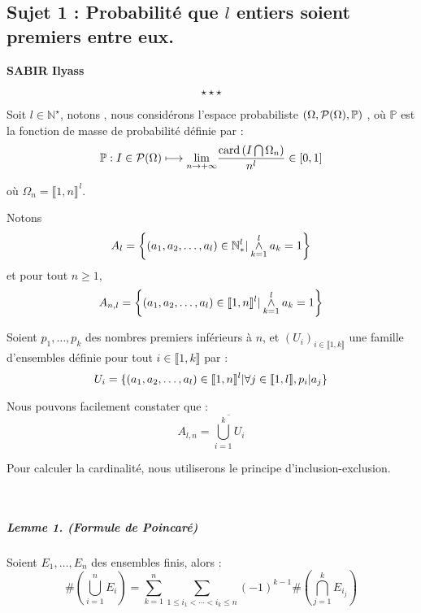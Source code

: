 \begin{center}
\subsection*{Sujet 1 : Probabilit{\'e} que $l$ entiers soient premiers entre eux.}\label{sjt1}
\textbf{SABIR Ilyass}
\end{center}
\[ \star \star \star \]
Soit $l \in \mathbb{N}^{\star}$, notons  , nous consid{\'e}rons
l'espace probabiliste $\tmcolor{red}{\tmcolor{black}{(\Omega, \mathcal{P}
(\Omega), \mathbb{P})}}$ , o{\`u} $\mathbb{P}$ est la fonction de masse de
probabilit{\'e} d{\'e}finie par :
\[ \mathbb{P}: I \in \mathcal{P} (\Omega) \longmapsto \underset{n \rightarrow
   + \infty}{\lim} \frac{\tmop{card} \left( I \bigcap \Omega_n \right)}{n^l}
   \in [0, 1] \]

o{\`u} $\Omega_n = {\llbracket 1, n \rrbracket^{} }^{ l}$.

Notons
\[ A_l = \left\{ (a_1, a_2, \ldots, a_l) \in \mathbb{N}_{\ast}^l  | \nobracket
   \underset{k = 1}{\overset{l}{\wedge}} a_k = 1 \right\} \]
et pour tout $n \geqslant 1$,
\[ A_{n, l} = \left\{ (a_1, a_2, \ldots, a_l) \in \llbracket 1, n \rrbracket^l
   | \nobracket  \underset{k = 1}{\overset{l}{\wedge}} a_k = 1 \right\} \]


Soient $p_1, \ldots, p_k$ des nombres premiers inf{\'e}rieurs {\`a} $n$, et
$(U_i)_{i \in \llbracket 1, k \rrbracket}$ une famille d'ensembles d{\'e}finie
pour tout $i \in \llbracket 1, k \rrbracket$ par :
\[ U_i = \{ (a_1, a_2, \ldots, a_l) \in \llbracket 1, n \rrbracket^l  |
   \nobracket \forall j \in \llbracket 1, l \rrbracket, p_i | a_j \nobracket
   \} \]


Nous pouvons facilement constater que :
\[ A_{l, n} = \overline{\underset{i = 1}{\overset{k}{\bigcup}} U_i} \]


Pour calculer la cardinalit{\'e}, nous utiliserons le principe d'inclusion-exclusion.

\

\subparagraph{Lemme 1. (Formule de Poincar{\'e})}

Soient $E_1, \ldots, E_n$ des ensembles finis, alors :
\[ \# \left( \underset{i = 1}{\overset{n}{\bigcup}} E_i \right) =
   \underset{}{\overset{n}{\underset{k = 1}{\sum}} \underset{1 \leqslant i_1 <
   \cdots < i_k \leqslant n}{\sum} (- 1)^{k - 1} \# \left(
   \overset{k}{\underset{j = 1}{\bigcap}} E_{i_j} \right)} \]

